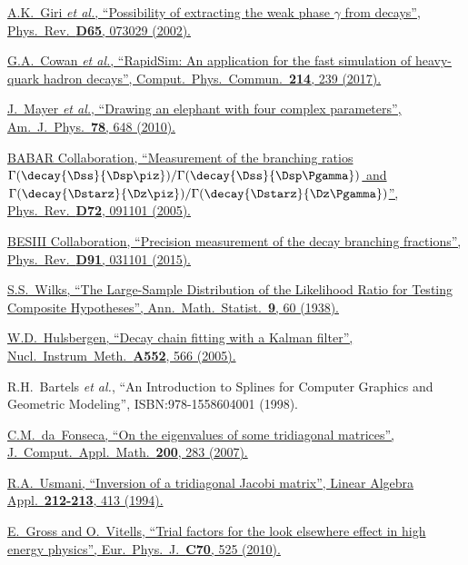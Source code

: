 \href{https://doi.org/10.1103/PhysRevD.65.073029}{A.K.~Giri \textit{et al.}, \enquote{Possibility of extracting the weak phase $\gamma$ from \decay{\Lb}{\Lz\Dz} decays}, Phys.\ Rev.\ \textbf{D65}, 073029 (2002).}

\href{https://doi.org/10.1016/j.cpc.2017.01.029}{G.A.~Cowan \textit{et al.}, \enquote{RapidSim: An application for the fast simulation of heavy-quark hadron decays}, Comput.\ Phys.\ Commun.\ \textbf{214}, 239 (2017).}

\href{https://doi.org/10.1119/1.3254017}{J.~Mayer \textit{et al.}, \enquote{Drawing an elephant with four complex parameters}, Am.\ J.\ Phys.\ \textbf{78}, 648 (2010).}

\href{https://doi.org/10.1103/PhysRevD.72.091101}{BABAR Collaboration, \enquote{Measurement of the branching ratios $\Gamma(\decay{\Dss}{\Dsp\piz}) / \Gamma(\decay{\Dss}{\Dsp\Pgamma})$ and $\Gamma(\decay{\Dstarz}{\Dz\piz}) / \Gamma(\decay{\Dstarz}{\Dz\Pgamma})$}, Phys.\ Rev.\ \textbf{D72}, 091101 (2005).}

\href{https://doi.org/10.1103/PhysRevD.91.031101}{BESIII Collaboration, \enquote{Precision measurement of the \Dstarz decay branching fractions}, Phys.\ Rev.\ \textbf{D91}, 031101 (2015).}

\href{https://doi.org/10.1214/aoms/1177732360}{S.S.~Wilks, \enquote{The Large-Sample Distribution of the Likelihood Ratio for Testing Composite Hypotheses}, Ann.\ Math.\ Statist.\ \textbf{9}, 60 (1938).}

\href{https://doi.org/10.1016/j.nima.2005.06.078}{W.D.~Hulsbergen, \enquote{Decay chain fitting with a Kalman filter}, Nucl.\ Instrum\ Meth.\ \textbf{A552}, 566 (2005).}

R.H.~Bartels \textit{et al.}, \enquote{An Introduction to Splines for Computer Graphics and Geometric Modeling}, ISBN:978-1558604001 (1998).

\href{https://doi.org/10.1016/j.cam.2005.08.047}{C.M.~da~Fonseca, \enquote{On the eigenvalues of some tridiagonal matrices}, J.\ Comput.\ Appl.\ Math.\ \textbf{200}, 283 (2007).}

\href{https://doi.org/10.1016/0024-3795(94)90414-6}{R.A.~Usmani, \enquote{Inversion of a tridiagonal Jacobi matrix}, Linear Algebra Appl.\ \textbf{212-213}, 413 (1994).}

\href{https://doi.org/10.1140/epjc/s10052-010-1470-8}{E.~Gross and O.~Vitells, \enquote{Trial factors for the look elsewhere effect in high energy physics}, Eur.\ Phys.\ J.\ \textbf{C70}, 525 (2010).}

